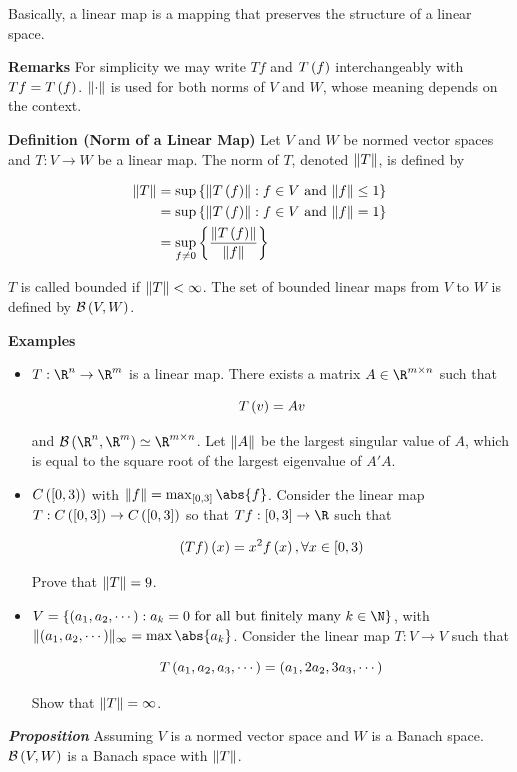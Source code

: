 \documentclass[
]{article}
\begin{document}
Basically, a linear map is a mapping that preserves the structure of a
linear space.

\textbf{Remarks} For simplicity we may write \(Tf\) and \(T\left(f\right)\)
interchangeably with \(Tf = T\left(f\right)\). \(\|{\cdot}\|\) is used for both
norms of \(V\) and \(W\), whose meaning depends on the context.

\textbf{Definition (Norm of a Linear Map)} Let \(V\) and \(W\) be normed
vector spaces and \(T:V\to W\) be a linear map. The norm of \(T\),
denoted \(\|{T}\|\), is defined by

\[\begin{aligned}
\|{T}\| & = \sup\left\{\|{T\left(f\right)}\|:f\in V \text{ and }\|{f}\|\le 1\right\}\\
& = \sup\left\{\|{T\left(f\right)}\|:f\in V \text{ and }\|{f}\|= 1\right\}\\
& = \sup_{f\ne 0}\left\{\frac{\|{T\left(f\right)}\|}{\|{f}\|}\right\}
\end{aligned}\]

\(T\) is called bounded if \(\|{T}\|<\infty\). The set of bounded
linear maps from \(V\) to \(W\) is defined by \(\mathcal B\left(V,W\right)\).

\textbf{Examples}

\begin{itemize}
\item
  \(T:\R^n\to\R^m\) is a linear map. There exists a matrix
  \(A\in \R^{m\times n}\) such that

  \[T\left(v\right) = Av\]

  and \(\B\pr{\R^n,\R^m}\simeq \R^{m\times n}\). Let \(\|{A}\|\) be the
  largest singular value of \(A\), which is equal to the square root of
  the largest eigenvalue of \(A'A\).
\item
  \(C\left([0,3)\right)\) with \(\norm{f} = \max_{\br{0,3}}\abs{f}\). Consider
  the linear map \(T:C\left(\left[0,3\right]\right)\to C\left(\left[0,3\right]\right)\) so that
  \(Tf:\br{0,3}\to \R\) such that

  \[\left(Tf\right)\left(x\right) = x^2f\left(x\right),\forall x\in [0,3)\]

  Prove that \(\|{T}\| = 9\).
\item
  \(V = \brace{\pr{a_1,a_2,\cdots}:a_k = 0 \text{ for all but finitely many }k\in \N}\),
  with \(\norm{\pr{a_1,a_2,\cdots}}_{\infty} = \max\abs{a_k}\). Consider
  the linear map \(T:V\to V\) such that

  \[T\left(a_1,a_2,a_3,\cdots\right) = \left(a_1,2a_2,3a_3,\cdots\right)\]

  Show that \(\|{T}\| = \infty\).
\end{itemize}

\emph{\textbf{Proposition}} Assuming \(V\) is a normed vector space and
\(W\) is a Banach space. \(\mathcal B\left(V,W\right)\) is a Banach space with
\(\|{T}\|\).
\end{document}
